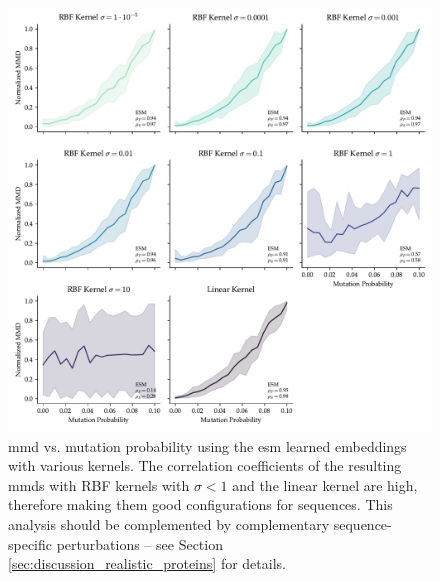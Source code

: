 
\begin{figure}
  \centering
  \includegraphics[width=\textwidth]{./figures/results/res_5.pdf}
  \caption[\acrshort{mmd} using \acrshort{esm} embeddings.]{\acrshort{mmd} vs. mutation probability using the \acrshort{esm}
learned embeddings with various kernels. The correlation coefficients of the
resulting \acrshort{mmd}s with RBF kernels with $\sigma<1$ and the linear kernel are high,
therefore making them good configurations for sequences. This analysis should be
complemented by complementary sequence-specific perturbations -- see Section
\ref{sec:discussion_realistic_proteins} for details.}
  \label{fig:esm_descriptor}
\end{figure}

